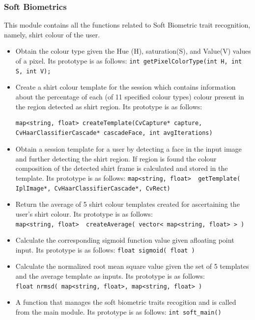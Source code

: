 \documentclass[12pt]{article}			%
\begin{document}
\subsubsection { Soft Biometrics }
This module contains all the functions related to Soft Biometric trait recognition, namely, shirt colour of the user.

\begin{itemize}
\item Obtain the colour type given the Hue (H), saturation(S), and Value(V) values of a pixel. Its prototype is as follows:
\verb+int getPixelColorType(int H, int S, int V);+

\item Create a shirt colour template for the session which contains information about the percentage of each (of 11 specified colour types) colour present in the region detected as shirt region. Its prototype is as follows:
\begin{verbatim}
map<string, float> createTemplate(CvCapture* capture,
CvHaarClassifierCascade* cascadeFace, int avgIterations)
\end{verbatim}
\item Obtain a session template for a user by detecting a face in the input image and further detecting the shirt region. If region is found the colour composition of the detected shirt frame is calculated and stored in the template. Its prototype is as follows:
\verb+map<string, float>  getTemplate( IplImage*, CvHaarClassifierCascade*, CvRect)+

\item Return the average of 5 shirt colour templates created for ascertaining the user's shirt colour. Its prototype is as follows:\\
\verb+map<string, float>  createAverage( vector< map<string, float> > )+

\item Calculate the corresponding sigmoid function value given afloating point input. Its prototype is as follows:
\verb+float sigmoid( float )+

\item Calculate the normalized root mean square value given the set of 5 templates and the average template as inputs. Its prototype is as follows: \\
\verb+float nrmsd( map<string, float>, map<string, float> )+

\item A function that manages the soft biometric traits recogition and is called from the main module. Its prototype is as follows:
\verb+int soft_main()+
\end{itemize}
\end{document}

